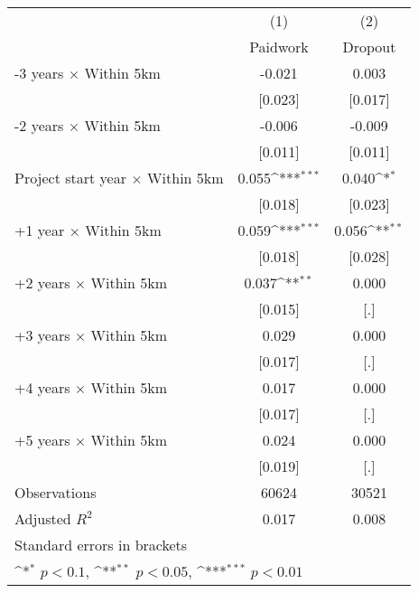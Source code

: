 {
\def\sym#1{\ifmmode^{#1}\else\(^{#1}\)\fi}
\begin{tabular}{l*{2}{c}}
\hline\hline
                    &\multicolumn{1}{c}{(1)}&\multicolumn{1}{c}{(2)}\\
                    &\multicolumn{1}{c}{Paidwork}&\multicolumn{1}{c}{Dropout}\\
\hline
-3 years $\times$ Within 5km&      -0.021         &       0.003         \\
                    &     [0.023]         &     [0.017]         \\
-2 years $\times$ Within 5km&      -0.006         &      -0.009         \\
                    &     [0.011]         &     [0.011]         \\
Project start year $\times$ Within 5km&       0.055\sym{***}&       0.040\sym{*}  \\
                    &     [0.018]         &     [0.023]         \\
+1 year $\times$ Within 5km&       0.059\sym{***}&       0.056\sym{**} \\
                    &     [0.018]         &     [0.028]         \\
+2 years $\times$ Within 5km&       0.037\sym{**} &       0.000         \\
                    &     [0.015]         &         [.]         \\
+3 years $\times$ Within 5km&       0.029         &       0.000         \\
                    &     [0.017]         &         [.]         \\
+4 years $\times$ Within 5km&       0.017         &       0.000         \\
                    &     [0.017]         &         [.]         \\
+5 years $\times$ Within 5km&       0.024         &       0.000         \\
                    &     [0.019]         &         [.]         \\
\hline
Observations        &       60624         &       30521         \\
Adjusted \(R^{2}\)  &       0.017         &       0.008         \\
\hline\hline
\multicolumn{3}{l}{\footnotesize Standard errors in brackets}\\
\multicolumn{3}{l}{\footnotesize \sym{*} \(p<0.1\), \sym{**} \(p<0.05\), \sym{***} \(p<0.01\)}\\
\end{tabular}
}
